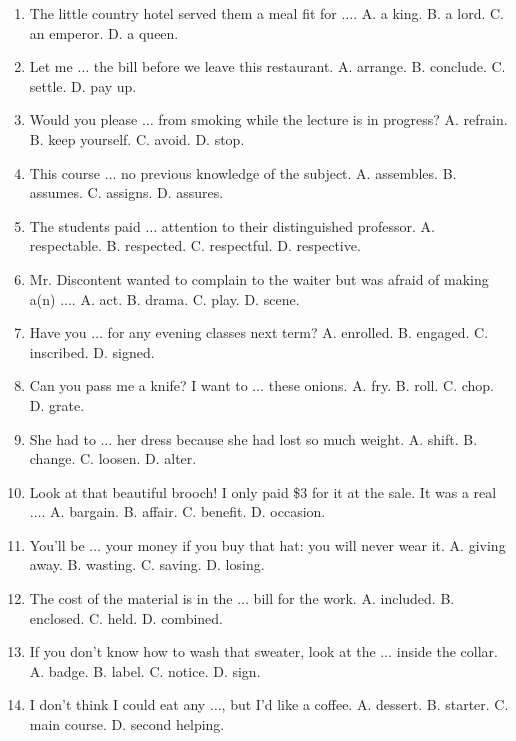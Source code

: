 \documentclass{article}
\numberwithin{equation}{section}
\begin{document}
\begin{enumerate}[leftmargin=2mm]
	\item The little country hotel served them a meal fit for $\ldots$. {\sf A.} a king. {\sf B.} a lord. {\sf C.} an emperor. {\sf D.} a queen.
	\item Let me $\ldots$ the bill before we leave this restaurant. {\sf A.} arrange. {\sf B.} conclude. {\sf C.} settle. {\sf D.} pay up.
	\item Would you please $\ldots$ from smoking while the lecture is in progress? {\sf A.} refrain. {\sf B.} keep yourself. {\sf C.} avoid. {\sf D.} stop.
	\item This course $\ldots$ no previous knowledge of the subject. {\sf A.} assembles. {\sf B.} assumes. {\sf C.} assigns. {\sf D.} assures.
	\item The students paid $\ldots$ attention to their distinguished professor. {\sf A.} respectable. {\sf B.} respected. {\sf C.} respectful. {\sf D.} respective.
	\item Mr. Discontent wanted to complain to the waiter but was afraid of making a(n) $\ldots$. {\sf A.} act. {\sf B.} drama. {\sf C.} play. {\sf D.} scene.
	\item Have you $\ldots$ for any evening classes next term? {\sf A.} enrolled. {\sf B.} engaged. {\sf C.} inscribed. {\sf D.} signed.
	\item Can you pass me a knife? I want to $\ldots$ these onions. {\sf A.} fry. {\sf B.} roll. {\sf C.} chop. {\sf D.} grate.
	\item She had to $\ldots$ her dress because she had lost so much weight. {\sf A.} shift. {\sf B.} change. {\sf C.} loosen. {\sf D.} alter.
	\item Look at that beautiful brooch! I only paid \$3 for it at the sale. It was a real $\ldots$. {\sf A.} bargain. {\sf B.} affair. {\sf C.} benefit. {\sf D.} occasion.
	\item You'll be $\ldots$ your money if you buy that hat: you will never wear it. {\sf A.} giving away. {\sf B.} wasting. {\sf C.} saving. {\sf D.} losing.
	\item The cost of the material is in the $\ldots$ bill for the work. {\sf A.} included. {\sf B.} enclosed. {\sf C.} held. {\sf D.} combined.
	\item If you don't know how to wash that sweater, look at the $\ldots$ inside the collar. {\sf A.} badge. {\sf B.} label. {\sf C.} notice. {\sf D.} sign.
	\item I don't think I could eat any $\ldots$, but I'd like a coffee. {\sf A.} dessert. {\sf B.} starter. {\sf C.} main course. {\sf D.} second helping.

\end{enumerate}
\end{document}
